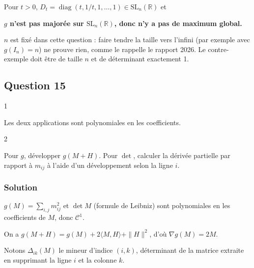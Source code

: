 \documentclass[11pt,a4paper]{article}
\newcommand{\equationajustee}[1]{%
  \sbox{\boiteequation}{$\displaystyle #1$}%
  \ifdim\wd\boiteequation>\linewidth
    \[\resizebox{\linewidth}{!}{\usebox{\boiteequation}}\]%
  \else
    \[#1\]%
  \fi}
\begin{document}
Pour \(t>0\), \(D_t=\operatorname{diag}(t,\allowbreak 1/t,\allowbreak 1,\allowbreak \dots,\allowbreak 1)\in{\mathrm{SL}}_n(\mathbb{R})\) et

\equationajustee{g(D_t)=t^2+t^{-2}+n-2\xrightarrow[t\to+\infty]{}+\infty.}

\textbf{\(g\) n'est pas majorée sur \({\mathrm{SL}}_n(\mathbb{R})\), donc n'y a pas de maximum global.}

\begin{piege}

\(n\) est fixé dans cette question : faire tendre la taille vers l'infini (par exemple avec \(g(I_n)=n\)) ne prouve rien, comme le rappelle le rapport 2026. Le contre-exemple doit être de taille \(n\) et de déterminant exactement 1.

\end{piege}

\hypertarget{question-15}{%
\subsection{Question 15}\label{question-15}}

\begin{indication}{1}

Les deux applications sont polynomiales en les coefficients.

\end{indication}

\begin{indication}{2}

Pour \(g\), développer \(g(M+H)\). Pour \(\det\), calculer la dérivée partielle par rapport à \(m_{ij}\) à l'aide d'un développement selon la ligne \(i\).

\end{indication}

\hypertarget{solution-14}{%
\subsubsection{Solution}\label{solution-14}}

\(g(M)=\sum_{i,j}m_{ij}^2\) et \(\det M\) (formule de Leibniz) sont polynomiales en les coefficients de \(M\), donc \({\mathcal{C}}^1\).

On a \(g(M+H)=g(M)+2\langle M,H\rangle+\|H\|^2\), d'où \(\boxed{\nabla g(M)=2M}\).

Notons \(\Delta_{ik}(M)\) le mineur d'indice \((i,k)\), déterminant de la matrice extraite en supprimant la ligne \(i\) et la colonne \(k\).
\end{document}
